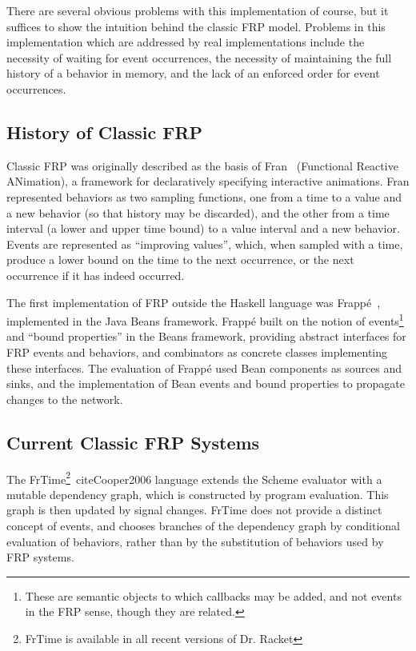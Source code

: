 There are several obvious problems with this implementation of course, but it
suffices to show the intuition behind the classic FRP model. Problems in this
implementation which are addressed by real implementations include the necessity
of waiting for event occurrences, the necessity of maintaining the full history
of a behavior in memory, and the lack of an enforced order for event
occurrences.

\subsection{History of Classic FRP}
\label{subsection:Background-Classic_FRP-History_of_Classic_FRP}
Classic FRP was originally described as the basis of Fran~\cite{Elliott1997}
(Functional Reactive ANimation), a framework for declaratively specifying
interactive animations. Fran represented behaviors as two sampling functions,
one from a time to a value and a new behavior (so that history may be discarded),
and the other from a time interval (a lower and upper time bound) to a value
interval and a new behavior. Events are represented as ``improving values'',
which, when sampled with a time, produce a lower bound on the time to the next
occurrence, or the next occurrence if it has indeed occurred.

The first implementation of FRP outside the Haskell language was Frapp\'{e}~\cite{Courtney2001-2},
implemented in the Java Beans framework. Frapp\'{e} built on the notion
of events\footnote{These are semantic objects to which callbacks may be added,
and not events in the FRP sense, though they are related.} and ``bound
properties'' in the Beans framework, providing abstract interfaces for FRP
events and behaviors, and combinators as concrete classes implementing these
interfaces. The evaluation of Frapp\'{e} used Bean components as sources and
sinks, and the implementation of Bean events and bound properties to propagate
changes to the network.

\subsection{Current Classic FRP Systems}
\label{subsection:Background-Classic_FRP-Current_Classic_FRP_Systems}

The FrTime\footnote{FrTime is available in all recent versions of Dr. Racket}~cite{Cooper2006}
language extends the Scheme evaluator with a mutable dependency graph, which is
constructed by program evaluation. This graph is then updated by signal changes.
FrTime does not provide a distinct concept of events, and chooses branches of
the dependency graph by conditional evaluation of behaviors, rather than by the
substitution of behaviors used by FRP systems.

